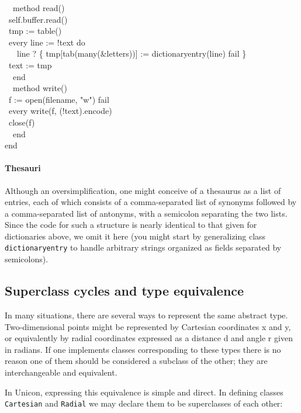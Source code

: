 {\ \ method read() \\
\>   \ self.buffer.read() \\
\>   \ tmp := table() \\
\>   \ every line := !text do \\
\>   \ \ \ line ? \{ tmp[tab(many(\&letters))] := dictionaryentry(line)
{\textbar} fail \} \\
\>   \ text := tmp \\
\ \ end \\
\ \ method write() \\
\>   \ f := open(filename, "w") {\textbar}
fail \\
\>   \ every write(f, (!text).encode) \\
\>   \ close(f) \\
\ \ end \\
end
}

\paragraph{Thesauri}
Although an oversimplification, one might conceive of a thesaurus as a
list of entries, each of which consists of a comma-separated list of
synonyms followed by a comma-separated list of antonyms, with a
semicolon separating the two lists. Since the code for such a structure
is nearly identical to that given for dictionaries above, we omit it
here (you might start by generalizing class \texttt{dictionaryentry} to
handle arbitrary strings organized as fields separated by semicolons). 

\subsection{Superclass cycles and type equivalence}

In many situations, there are several ways to represent the same
abstract type. Two-dimensional points might be represented by
Cartesian coordinates x and y, or
equivalently by radial coordinates expressed as a distance d and angle
r given in radians. If one implements classes
corresponding to these types there is no reason one of them should be
considered a subclass of the other; they are interchangeable and
equivalent.

In Unicon, expressing this equivalence is simple and direct. In defining
classes \texttt{Cartesian} and \texttt{Radial} we may declare them to
be superclasses of each other: 


